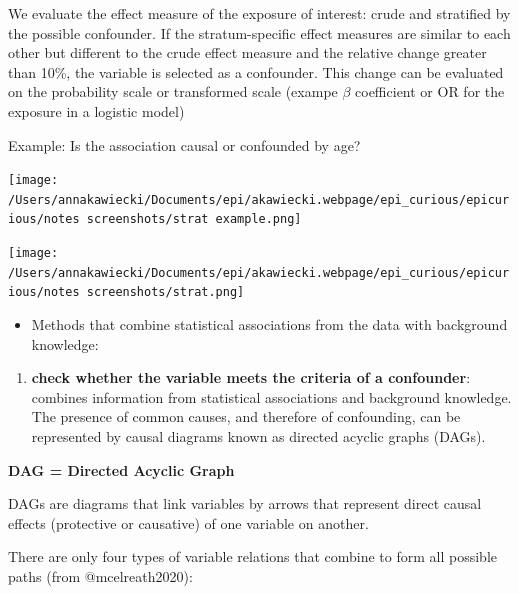 \documentclass[
]{article}
\providecommand{\tightlist}{%
  \setlength{\itemsep}{0pt}\setlength{\parskip}{0pt}}
\begin{document}
We evaluate the effect measure of the exposure of interest: crude and
stratified by the possible confounder. If the stratum-specific effect
measures are similar to each other but different to the crude effect
measure and the relative change greater than 10\%, the variable is
selected as a confounder. This change can be evaluated on the
probability scale or transformed scale (exampe \(\beta\) coefficient or
OR for the exposure in a logistic model)

Example: Is the association causal or confounded by age?

\texttt{[image: /Users/annakawiecki/Documents/epi/akawiecki.webpage/epi\_curious/epicurious/notes screenshots/strat example.png]}

\texttt{[image: /Users/annakawiecki/Documents/epi/akawiecki.webpage/epi\_curious/epicurious/notes screenshots/strat.png]}

\begin{itemize}
\tightlist
\item
  Methods that combine statistical associations from the data with
  background knowledge:
\end{itemize}

\begin{enumerate}
\def\labelenumi{\arabic{enumi}.}
\setcounter{enumi}{2}
\tightlist
\item
  \textbf{check whether the variable meets the criteria of a
  confounder}: combines information from statistical associations and
  background knowledge. The presence of common causes, and therefore of
  confounding, can be represented by causal diagrams known as directed
  acyclic graphs (DAGs).
\end{enumerate}

\textbf{DAG = Directed Acyclic Graph}

DAGs are diagrams that link variables by arrows that represent direct
causal effects (protective or causative) of one variable on another.

There are only four types of variable relations that combine to form all
possible paths (from @mcelreath2020):
\end{document}
